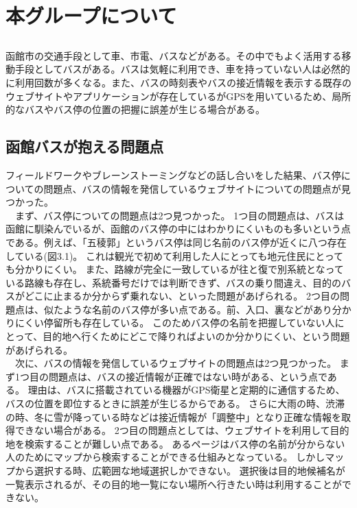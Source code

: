 \documentclass[openany,11pt,papersize]{jsbook}
\begin{document}
  
  \tableofcontents%
  
  
  \mainmatter%
  
  
  
  
  
  
  \chapter{本グループについて}


\section{}

函館市の交通手段として車、市電、バスなどがある。その中でもよく活用する移動手段としてバスがある。バスは気軽に利用でき、車を持っていない人は必然的に利用回数が多くなる。また、バスの時刻表やバスの接近情報を表示する既存のウェブサイトやアプリケーションが存在しているがGPSを用いているため、局所的なバスやバス停の位置の把握に誤差が生じる場合がある。


\section{函館バスが抱える問題点}

フィールドワークやブレーンストーミングなどの話し合いをした結果、バス停についての問題点、バスの情報を発信しているウェブサイトについての問題点が見つかった。\\
　まず、バス停についての問題点は2つ見つかった。
 1つ目の問題点は、バスは函館に馴染んでいるが、函館のバス停の中にはわかりにくいものも多いという点である。例えば、「五稜郭」というバス停は同じ名前のバス停が近くに八つ存在している(図3.1)。
 これは観光で初めて利用した人にとっても地元住民にとっても分かりにくい。
 また、路線が完全に一致しているが往と復で別系統となっている路線も存在し、系統番号だけでは判断できず、バスの乗り間違え、目的のバスがどこに止まるか分からず乗れない、といった問題があげられる。
 2つ目の問題点は、似たような名前のバス停が多い点である。前、入口、裏などがあり分かりにくい停留所も存在している。
 このためバス停の名前を把握していない人にとって、目的地へ行くためにどこで降りればよいのか分かりにくい、という問題があげられる。\\
　次に、バスの情報を発信しているウェブサイトの問題点は2つ見つかった。
まず1つ目の問題点は、バスの接近情報が正確ではない時がある、という点である。
理由は、バスに搭載されている機器がGPS衛星と定期的に通信するため、バスの位置を即位するときに誤差が生じるからである。
さらに大雨の時、渋滞の時、冬に雪が降っている時などは接近情報が「調整中」となり正確な情報を取得できない場合がある。
2つ目の問題点としては、ウェブサイトを利用して目的地を検索することが難しい点である。
あるページはバス停の名前が分からない人のためにマップから検索することができる仕組みとなっている。
しかしマップから選択する時、広範囲な地域選択しかできない。
選択後は目的地候補名が一覧表示されるが、その目的地一覧にない場所へ行きたい時は利用することができない。
\end{document}
